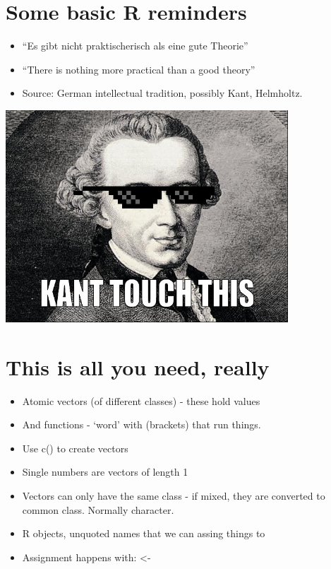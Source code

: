 \documentclass[
  letterpaper,
  DIV=11,
  numbers=noendperiod]{scrreprt}
\providecommand{\tightlist}{%
  \setlength{\itemsep}{0pt}\setlength{\parskip}{0pt}}\usepackage{longtable,booktabs,array}
\begin{document}
\hypertarget{some-basic-r-reminders}{%
\section{Some basic R reminders}\label{some-basic-r-reminders}}

\begin{itemize}
\tightlist
\item
  ``Es gibt nicht praktischerisch als eine gute Theorie''
\item
  ``There is nothing more practical than a good theory''
\item
  Source: German intellectual tradition, possibly Kant, Helmholtz.
\end{itemize}

\includegraphics[width=4.16667in,height=\textheight]{training-materials/presentation/kant.jpeg}

\hypertarget{this-is-all-you-need-really}{%
\section{This is all you need,
really}\label{this-is-all-you-need-really}}

\begin{itemize}
\tightlist
\item
  Atomic vectors (of different classes) - these hold values
\item
  And functions - `word' with (brackets) that run things.
\item
  Use c() to create vectors
\item
  Single numbers are vectors of length 1
\item
  Vectors can only have the same class - if mixed, they are converted to
  common class. Normally character.
\item
  R objects, unquoted names that we can assing things to
\item
  Assignment happens with: \textless-
\end{itemize}
\end{document}
